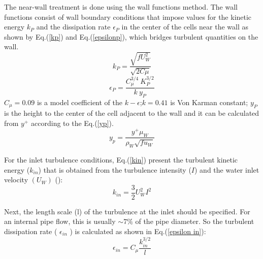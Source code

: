 \documentclass[11pt]{report}
\begin{document}
 The near-wall treatment is done using the wall functions method. 
 The wall functions consist of wall boundary conditions that impose values for the kinetic energy $k_{P}$ and the dissipation rate $\epsilon_{P}$  in the center of the cells near the wall as shown by Eq.(\ref{kp}) and Eq.(\ref{epsilonp}), which bridges turbulent quantities on the wall.
%
 \begin{equation}
 k_{P} =\frac{\sqrt{f {U_{W}^2 }}}{\sqrt{2 C\mu }}
 \label{kp}
 \end{equation}
%
 \begin{equation}
 \epsilon_{P} =\frac{C^{3/4}_{\mu } \ K^{3/2}_{P}}{k\ y_{P}}
 \label{epsilonp}
 \end{equation}
 \(C_{\mu}=0.09\) is a model coefficient of the \(k-\epsilon\);\quad $k=0.41$ is Von Karman constant; 
  $y_{P}$ is the height to the center of the cell adjacent to the wall and it can be calculated from $y^+$ according to the Eq.(\ref{yp}).
%
 \begin{equation}
y_{p}=\frac{y^{+} \mu_W}{\rho_W\sqrt{f u_{W}}}
 \label{yp}
 \end{equation}

 For the inlet turbulence conditions, Eq.(\ref{kin}) present the turbulent kinetic energy (\(k_{in}\)) that is obtained from the turbulence intensity (\(I\)) and the water inlet velocity \((U_W)\) (\citet{Messa-2020}):
%
 \begin{equation}
 k_{in} =\frac{3}{2} U_W^{2} I^{2} 
 \label{kin}
 \end{equation}

 Next, the length scale (l) of the turbulence at the inlet should be specified. For an internal pipe flow, this is usually \(\sim 7 \%\) of the pipe diameter. So the turbulent dissipation rate ( \(\epsilon_{in}\) ) is calculated as shown in Eq.(\ref{epsilon in}): 
 \begin{equation}
 \epsilon_{in}=C_{\mu} \frac{k_{in}^{3 / 2}}{l} 
 \label{epsilon in}
 \end{equation}


\end{document}
